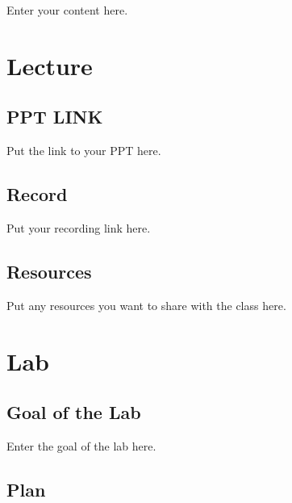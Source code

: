 \documentclass[
  letterpaper,
  oneside]{book}
\numberwithin{equation}{section}
\numberwithin{figure}{section}
\theoremstyle{break}
\begin{document}
Enter your content here.

\chapter*{Lecture}\label{lecture-1}


\section*{PPT LINK}\label{ppt-link-1}


Put the link to your PPT here.

\section*{Record}\label{record-1}


Put your recording link here.

\section*{Resources}\label{resources-1}


Put any resources you want to share with the class here.

\chapter*{Lab}\label{lab-1}


\section*{Goal of the Lab}\label{goal-of-the-lab-1}


Enter the goal of the lab here.

\section*{Plan}\label{plan-1}
\end{document}
